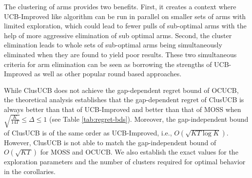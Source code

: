 The clustering of arms provides two benefits. First, it creates a context where UCB-Improved like algorithm can be run in parallel on smaller sets of arms with limited exploration, which could lead to fewer pulls of sub-optimal arms with the help of  more aggressive elimination of sub optimal arms. Second, the cluster elimination leads to whole sets of sub-optimal arms being simultaneously eliminated when they are found to yield poor results. These two simultaneous criteria for arm elimination can be seen as borrowing the strengths of UCB-Improved as well as other popular round based approaches.


While ClusUCB does not achieve the gap-dependent regret bound of OCUCB, the theoretical analysis establishes that the gap-dependent regret of ClusUCB is always better than that of UCB-Improved and better than that of MOSS when $\sqrt{\frac{K}{14T}} \leq \Delta\leq 1$ (see Table \ref{tab:regret-bds}). Moreover, the gap-independent bound of ClusUCB is of the same order as UCB-Improved, i.e., $O\left(\sqrt{KT\log K}\right)$. However, ClusUCB is not able to match the gap-independent bound of $O(\sqrt{KT})$ for MOSS and OCUCB. We also establish the exact values for the exploration parameters and the number of clusters required for optimal behavior in the corollaries.




